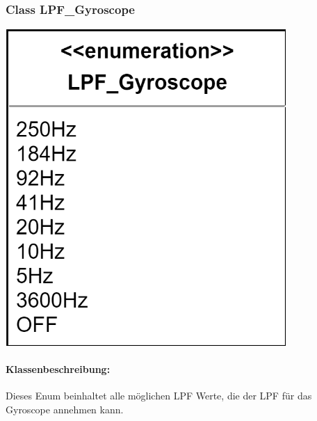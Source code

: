 \documentclass[a4paper,12pt]{article}
\begin{document}
\begin{minipage}[b]{0.5\textwidth}
	\subsubsection{Class LPF\_Gyroscope}
	\end{minipage}
	\begin{minipage}[c]{0.5\textwidth}
	\includegraphics[width=0.8\textwidth]{bilder/BibPackageKlassen/LPF_Gyrosope.png}
\end{minipage}

\paragraph{Klassenbeschreibung:}
Dieses Enum beinhaltet alle möglichen LPF Werte, die der LPF für das Gyroscope annehmen kann.
\end{document}
